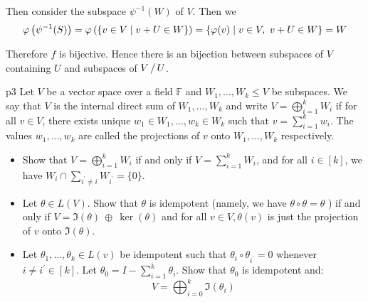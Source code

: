 \documentclass[a4paper, 11pt]{article}
\begin{document}
{\begin{enumerate}[label=(\alph*)]
\begin{itemize}
	Then consider the subspace $\psi^{-1}(W)$ of $V$. Then we  $$\varphi\left(\psi^{-1}(S)\right)=\varphi\left(\{v\in V\mid v+U\in W\}\right)=\{\varphi(v)\mid v\in V,\ v+U\in W\}=W$$
\end{itemize}
Therefore $f$ is bijective. Hence there is an bijection between subspaces of $V$ containing $U$ and subspaces of $\quotient{V}{U}$. 
\end{enumerate}
}
\pagebreak

\begin{problem}{%
	}{p3%
	}
Let $V$ be a vector space over a field $\mathbb{F}$ and $W_1, \ldots, W_k \leq V$ be subspaces. We say that $V$ is the internal direct sum of $W_1, \ldots, W_k$ and write $V=\bigoplus\limits_{i=1}^k W_i$ if for all $v \in V$, there exists unique $w_1 \in W_1, \ldots, w_k \in W_k$ such that $v=\sum\limits_{i=1}^k w_i$. The values $w_1, \ldots, w_k$ are called the projections of $v$ onto $W_1, \ldots, W_k$ respectively.\begin{itemize}
	\item Show that $V=\bigoplus\limits_{i=1}^k W_i$ if and only if $V=\sum\limits_{i=1}^k W_i$, and for all $i \in[k]$, we have $W_i \cap \sum\limits_{i^{\prime} \neq i} W_{i^{\prime}}=\{0\}$.
	\item Let $\theta \in L(V)$. Show that $\theta$ is idempotent (namely, we have $\theta \circ \theta=\theta$ ) if and only if $V=\Im(\theta) \ \oplus \ \ker(\theta)$ and for all $v \in V, \theta(v)$ is just the projection of $v$ onto $\Im(\theta)$.
	\item Let $\theta_1, \ldots, \theta_k \in L(v)$ be idempotent such that $\theta_i \circ \theta_{i^{\prime}}=0$ whenever $i \neq i^{\prime} \in[k]$. Let $\theta_0=I-\sum\limits_{i=1}^k \theta_i$. Show that $\theta_0$ is idempotent and:
	$$
	V=\bigoplus_{i=0}^k \Im\left(\theta_i\right)
	$$
\end{itemize}

\end{problem}
\end{document}
